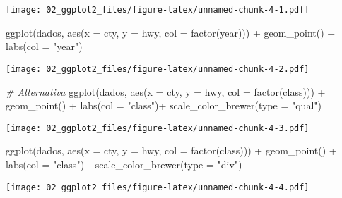 \documentclass[
]{book}
\newenvironment{Shaded}{\begin{snugshade}}{\end{snugshade}}
\newcommand{\AttributeTok}[1]{\textcolor[rgb]{0.77,0.63,0.00}{#1}}
\newcommand{\CommentTok}[1]{\textcolor[rgb]{0.56,0.35,0.01}{\textit{#1}}}
\newcommand{\FunctionTok}[1]{\textcolor[rgb]{0.00,0.00,0.00}{#1}}
\newcommand{\NormalTok}[1]{#1}
\newcommand{\SpecialCharTok}[1]{\textcolor[rgb]{0.00,0.00,0.00}{#1}}
\newcommand{\StringTok}[1]{\textcolor[rgb]{0.31,0.60,0.02}{#1}}
\begin{document}
\texttt{[image: 02\_ggplot2\_files/figure-latex/unnamed-chunk-4-1.pdf]}

\begin{Shaded}
\begin{Highlighting}[]
\FunctionTok{ggplot}\NormalTok{(dados, }\FunctionTok{aes}\NormalTok{(}\AttributeTok{x =}\NormalTok{ cty, }\AttributeTok{y =}\NormalTok{ hwy, }\AttributeTok{col =} \FunctionTok{factor}\NormalTok{(year))) }\SpecialCharTok{+} 
  \FunctionTok{geom\_point}\NormalTok{() }\SpecialCharTok{+} 
  \FunctionTok{labs}\NormalTok{(}\AttributeTok{col =} \StringTok{"year"}\NormalTok{)}
\end{Highlighting}
\end{Shaded}

\texttt{[image: 02\_ggplot2\_files/figure-latex/unnamed-chunk-4-2.pdf]}

\begin{Shaded}
\begin{Highlighting}[]
\CommentTok{\# Alternativa}
\FunctionTok{ggplot}\NormalTok{(dados, }\FunctionTok{aes}\NormalTok{(}\AttributeTok{x =}\NormalTok{ cty, }\AttributeTok{y =}\NormalTok{ hwy, }\AttributeTok{col =} \FunctionTok{factor}\NormalTok{(class))) }\SpecialCharTok{+} 
  \FunctionTok{geom\_point}\NormalTok{() }\SpecialCharTok{+} 
  \FunctionTok{labs}\NormalTok{(}\AttributeTok{col =} \StringTok{"class"}\NormalTok{)}\SpecialCharTok{+}
  \FunctionTok{scale\_color\_brewer}\NormalTok{(}\AttributeTok{type =} \StringTok{"qual"}\NormalTok{)}
\end{Highlighting}
\end{Shaded}

\texttt{[image: 02\_ggplot2\_files/figure-latex/unnamed-chunk-4-3.pdf]}

\begin{Shaded}
\begin{Highlighting}[]
\FunctionTok{ggplot}\NormalTok{(dados, }\FunctionTok{aes}\NormalTok{(}\AttributeTok{x =}\NormalTok{ cty, }\AttributeTok{y =}\NormalTok{ hwy, }\AttributeTok{col =} \FunctionTok{factor}\NormalTok{(class))) }\SpecialCharTok{+} 
  \FunctionTok{geom\_point}\NormalTok{() }\SpecialCharTok{+} 
  \FunctionTok{labs}\NormalTok{(}\AttributeTok{col =} \StringTok{"class"}\NormalTok{)}\SpecialCharTok{+}
  \FunctionTok{scale\_color\_brewer}\NormalTok{(}\AttributeTok{type =} \StringTok{"div"}\NormalTok{)}
\end{Highlighting}
\end{Shaded}

\texttt{[image: 02\_ggplot2\_files/figure-latex/unnamed-chunk-4-4.pdf]}
\end{document}
